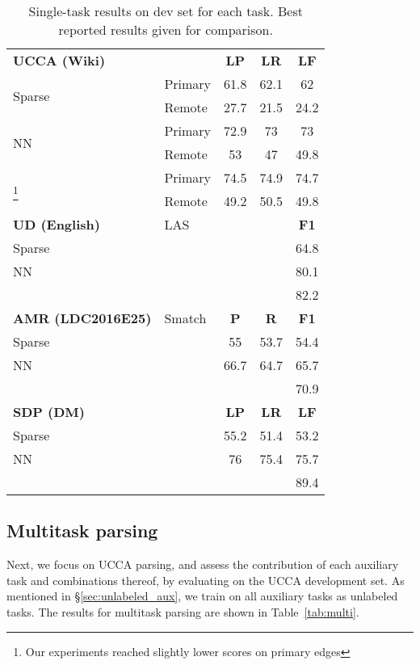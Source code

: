 \documentclass[11pt,a4paper]{article}
\begin{document}
\begin{table}
\begin{tabular}{llccc}
\textbf{UCCA \small(Wiki)} & & \textbf{LP} & \textbf{LR} & \textbf{LF} \\
\multirow{2}{*}{Sparse} &
         \small Primary & 61.8 & 62.1 & 62 \\
       & \small Remote & 27.7 & 21.5 & 24.2 \\
\multirow{2}{*}{NN} &
         \small Primary & 72.9 & 73 & 73 \\
       & \small Remote & 53 & 47 & 49.8 \\
\multirow{2}{3cm}{\citet{hershcovich2017a}\footnote{Our experiments
    reached slightly lower scores on primary edges }} &
         \small Primary & 74.5 & 74.9 & 74.7 \\
       & \small Remote & 49.2 & 50.5 & 49.8 \\
\hline
\textbf{UD \small(English)} & \small LAS & & & \textbf{F1} \\
Sparse & & & & 64.8 \\
NN & & & & 80.1 \\
\multicolumn{4}{l}{\citet{dozat2016deep}} & 82.2 \\
\hline
\textbf{AMR \small(LDC2016E25)} & \small Smatch & \textbf{P} & \textbf{R} & \textbf{F1} \\
Sparse & & 55 & 53.7 & 54.4 \\
NN & & 66.7 & 64.7 & 65.7 \\
\multicolumn{4}{l}{\citet{foland2017abstract}} & 70.9 \\
\hline
\textbf{SDP \small(DM)} & & \textbf{LP} & \textbf{LR} & \textbf{LF} \\
Sparse & & 55.2 & 51.4 & 53.2 \\
NN & & 76 & 75.4 & 75.7 \\
\multicolumn{2}{l}{\citet{thomson-EtAl:2014:SemEval}} & & & 89.4
\end{tabular}
\caption{Single-task results on dev set for each task.
Best reported results given for comparison.
\label{tab:single}}
\end{table}


\subsection{Multitask parsing}\label{sec:results_multi}

Next, we focus on UCCA parsing, and assess the contribution of each auxiliary task
and combinations thereof, by evaluating on the UCCA development set.
As mentioned in \S\ref{sec:unlabeled_aux}, we train on all auxiliary tasks as unlabeled tasks.
The results for multitask parsing are shown in Table~\ref{tab:multi}.
\end{document}
